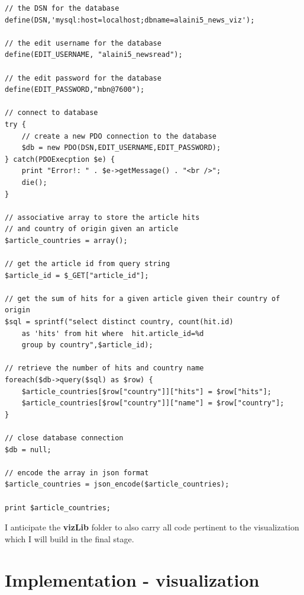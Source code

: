 \documentclass[12pt]{article}
\begin{document}
\begin{enumerate}
\begin{lstlisting}[basicstyle=\scriptsize]
// the DSN for the database
define(DSN,'mysql:host=localhost;dbname=alaini5_news_viz');

// the edit username for the database
define(EDIT_USERNAME, "alaini5_newsread");

// the edit password for the database
define(EDIT_PASSWORD,"mbn@7600");

// connect to database
try {
	// create a new PDO connection to the database
	$db = new PDO(DSN,EDIT_USERNAME,EDIT_PASSWORD);
} catch(PDOExecption $e) {
	print "Error!: " . $e->getMessage() . "<br />";
	die();
}

// associative array to store the article hits 
// and country of origin given an article
$article_countries = array();

// get the article id from query string
$article_id = $_GET["article_id"];

// get the sum of hits for a given article given their country of origin
$sql = sprintf("select distinct country, count(hit.id) 
	as 'hits' from hit where  hit.article_id=%d 
	group by country",$article_id);

// retrieve the number of hits and country name
foreach($db->query($sql) as $row) {
	$article_countries[$row["country"]]["hits"] = $row["hits"];
	$article_countries[$row["country"]]["name"] = $row["country"];
}

// close database connection
$db = null;

// encode the array in json format
$article_countries = json_encode($article_countries);

print $article_countries;
\end{lstlisting}

\end{enumerate}

\noindent I anticipate the \textbf{vizLib} folder to also carry all code pertinent to the visualization which I will build in the final stage. 

\section{Implementation - visualization}

\vfill
\end{document}
